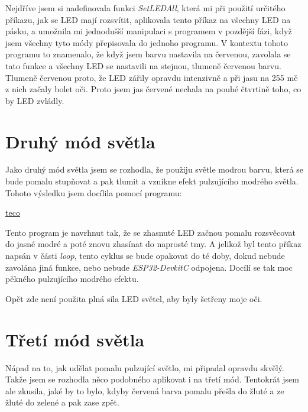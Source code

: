 Nejdříve jsem si nadefinovala funkci \emph{SetLEDAll}, která mi při použití určitého příkazu, jak se LED mají rozsvítit, aplikovala tento příkaz na všechny LED na pásku, a umožnila mi jednodušší manipulaci s programem v pozdější fázi, když jsem všechny tyto módy přepisovala do jednoho programu. 
V kontextu tohoto programu to znamenalo, že když jsem barvu nastavila na červenou, zavolala se tato funkce a všechny LED se nastavili na stejnou, tlumeně červenou barvu. Tlumeně červenou proto, že LED zářily opravdu intenzivně a při jasu na 255 mě z nich začaly bolet oči. Proto jsem jas červené nechala na pouhé čtvrtině toho, co by LED zvládly.



\section{Druhý mód světla}
Jako druhý mód světla jsem se rozhodla, že použiju světle modrou barvu, která se bude pomalu stupňovat a pak tlumit a vznikne efekt pulzujícího modrého světla. Tohoto výsledku jsem docílila pomocí programu: 

\href{https://www.tecomat.cz/products/}{teco}

%


Tento program je navrhnut tak, že se zhasnuté LED začnou pomalu rozsvěcovat do jasné modré a poté znovu zhasínat do naprosté tmy. A jelikož byl tento příkaz napsán v části \emph{loop}, tento cyklus se bude opakovat do té doby, dokud nebude zavolána jiná funkce, nebo nebude \emph{ESP32-DevkitC} odpojena. Docílí se tak moc pěkného pulzujícího modrého efektu. 

Opět zde není použita plná síla LED světel, aby byly šetřeny moje oči.  


\section{Třetí mód světla}
Nápad na to, jak udělat pomalu pulzující světlo, mi připadal opravdu skvělý. Takže jsem se rozhodla něco podobného aplikovat i na třetí mód. Tentokrát jsem ale zkusila, jaké by to bylo, kdyby červená barva pomalu přešla do žluté a ze žluté do zelené a pak zase zpět.


